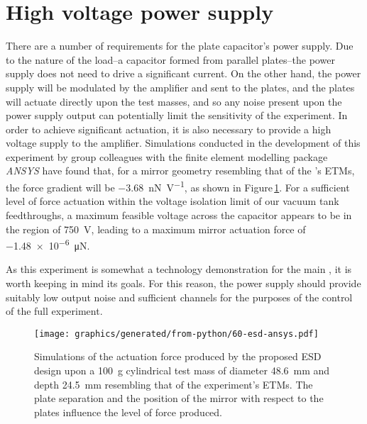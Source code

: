 \section{High voltage power supply}

\newcommand{\ESDFORCEGRAD}{\SI{-3.68}{\nano\newton\per\volt}}

\newcommand{\ESDMAXVOLTAGE}{\SI{750}{\volt}}

\newcommand{\ESDMAXFORCE}{\SI{-1.48e-6}{\micro\newton}}

There are a number of requirements for the plate capacitor's power supply. Due to the nature of the load--a capacitor formed from parallel plates--the power supply does not need to drive a significant current. On the other hand, the power supply will be modulated by the amplifier and sent to the plates, and the plates will actuate directly upon the test masses, and so any noise present upon the power supply output can potentially limit the sensitivity of the experiment. In order to achieve significant actuation, it is also necessary to provide a high voltage supply to the amplifier. Simulations conducted in the development of this experiment by group colleagues with the finite element modelling package \emph{ANSYS} have found that, for a mirror geometry resembling that of the \SSMEXPT{}'s ETMs, the force gradient will be \ESDFORCEGRAD{}, as shown in Figure\,\ref{fig:esd-ansys}. For a sufficient level of force actuation within the voltage isolation limit of our vacuum tank feedthroughs, a maximum feasible voltage across the capacitor appears to be in the region of \ESDMAXVOLTAGE{}, leading to a maximum mirror actuation force of \ESDMAXFORCE{}.

As this experiment is somewhat a technology demonstration for the main \SSMEXPT{}, it is worth keeping in mind its goals. For this reason, the power supply should provide suitably low output noise and sufficient channels for the purposes of the control of the full experiment.

\begin{figure}
  \centering
  \texttt{[image: graphics/generated/from-python/60-esd-ansys.pdf]}
  \caption{Simulations of the actuation force produced by the proposed \gls{ESD} design upon a \SI{100}{\gram} cylindrical test mass of diameter \SI{48.6}{\milli\meter} and depth \SI{24.5}{\milli\meter} resembling that of the \SSM experiment's ETMs. The plate separation and the position of the mirror with respect to the plates influence the level of force produced. }
  \label{fig:esd-ansys}
\end{figure}

